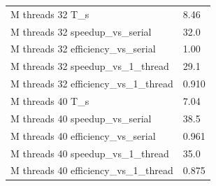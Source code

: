 \begin{tabular}{ll}
M threads 32 T\_s & 8.46 \\
M threads 32 speedup\_vs\_serial & 32.0 \\
M threads 32 efficiency\_vs\_serial & 1.00 \\
M threads 32 speedup\_vs\_1\_thread & 29.1 \\
M threads 32 efficiency\_vs\_1\_thread & 0.910 \\
M threads 40 T\_s & 7.04 \\
M threads 40 speedup\_vs\_serial & 38.5 \\
M threads 40 efficiency\_vs\_serial & 0.961 \\
M threads 40 speedup\_vs\_1\_thread & 35.0 \\
M threads 40 efficiency\_vs\_1\_thread & 0.875 \\
\end{tabular}
